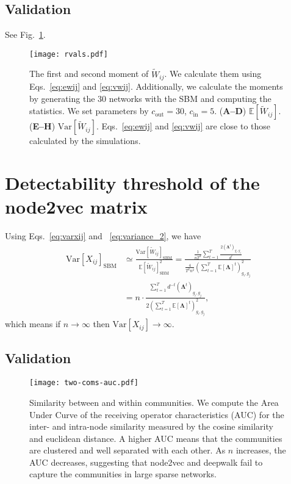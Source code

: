 \documentclass[12pt]{article} %
\def\mat#1{\mathbf{#1}}
\def\Exp{{\mathbb E}}
\def\Var{\text{Var}}
\begin{document}
\subsection{Validation}
See Fig.~\ref{fig:validation}.
\begin{figure}
    \centering
    \texttt{[image: rvals.pdf]}
    \caption{
        The first and second moment of $\tilde W_{ij}$.
        We calculate them using Eqs.~\eqref{eq:ewij} and \eqref{eq:vwij}.
        Additionally, we calculate the moments by
        generating the 30 networks with the SBM and computing the statistics.
        We set parameters by $c_{\text{out}} = 30$, $c_{\text{in}} = 5$.
        ({\bf A--D}) $\Exp[\tilde W_{ij}]$.
        ({\bf E--H}) $\Var[\tilde W_{ij}]$.
        Eqs.~\eqref{eq:ewij} and \eqref{eq:vwij} are close to those calculated by the simulations.
    }
    \label{fig:validation}
\end{figure}

\section{Detectability threshold of the node2vec matrix}

Using Eqs.~\eqref{eq:varxij} and ~\eqref{eq:variance_2}, we have
\begin{align}
    \Var\left[ X_{ij}\right]_{\text{SBM}}
     & \simeq \frac{\Var\left[\tilde W_{ij}\right]_{\text{SBM}}}{\Exp\left[ \tilde W_{ij}\right]^2 _{\text{SBM}}}
    = \frac{
        \frac{1}{nT^2} \sum_{t=1}^T \frac{ 2\left(\mat{\Lambda} ^t \right)_{g_i, g_j}}{d^t}
    }{
        \frac{4}{T^2n^2} \left( \sum_{t=1}^T \Exp\left[ \mat{\Lambda}\right]^t\right)_{g_i, g_j} ^2
    } \nonumber                                                                                                   \\
     & = n \cdot \frac{
        \sum_{t=1}^T d^{-t}\left(\mat{\Lambda} ^t \right)_{g_i, g_j}
    }{
        2\left( \sum_{t=1}^T \Exp\left[ \mat{\Lambda}\right]^t\right)_{g_i, g_j} ^2
    },
\end{align}
which means if $n \rightarrow \infty$ then $\Var[X_{ij}] \rightarrow \infty$.

\subsection{Validation}

\begin{figure}
    \centering
    \texttt{[image: two-coms-auc.pdf]}
    \caption{
        Similarity between and within communities.
        We compute the Area Under Curve of the receiving operator characteristics (AUC) for
        the inter- and intra-node similarity measured by the cosine similarity and euclidean distance.
        A higher AUC means that the communities are clustered and well separated with each other.
        As $n$ increases, the AUC decreases, suggesting that node2vec and deepwalk fail to capture the communities in large sparse networks.
    }
    \label{fig:two_com_n}
\end{figure}
\end{document}
